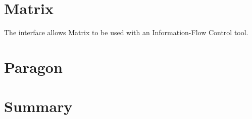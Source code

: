 

\section{Matrix}
The interface allows Matrix to be used with an Information-Flow Control tool.




\section{Paragon}









% 


\section{Summary}
